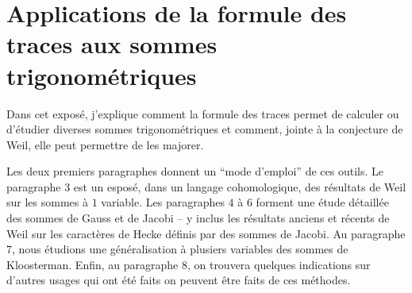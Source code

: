 
\chapter{Applications de la formule des traces aux sommes trigonométriques}\label{VI}










Dans cet expos\'e, j'explique comment la formule des traces permet de calculer 
ou d'\'etudier diverses sommes trigonom\'etriques et comment, jointe \`a la 
conjecture de Weil, elle peut permettre de les majorer.

Les deux premiers paragraphes donnent un ``mode d'emploi'' de ces outils. Le 
paragraphe 3 est un espos\'e, dans un langage cohomologique, des r\'esultats de 
Weil sur les sommes \`a $1$ variable. Les paragraphes $4$ \`a $6$ forment une 
\'etude d\'etaill\'ee des sommes de Gauss et de Jacobi -- y inclus les 
r\'esultats anciens et r\'ecents de Weil sur les caract\`eres de Hecke 
d\'efinis par des sommes de Jacobi. Au paragraphe $7$, nous \'etudions une 
g\'en\'eralisation \`a plusiers variables des sommes de Kloosterman. Enfin, au 
paragraphe $8$, on trouvera quelques indications sur d'autres usages qui ont 
\'et\'e faits on peuvent \^etre faits de ces m\'ethodes. 